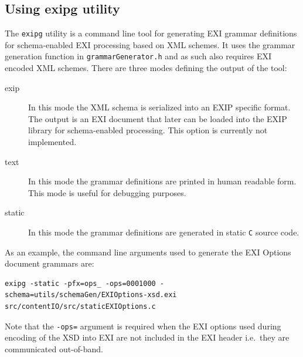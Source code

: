 \subsection{Using exipg utility}
The \texttt{exipg} utility is a command line tool for generating EXI grammar definitions
for schema-enabled EXI processing based on XML schemes.
It uses the grammar generation
function in \texttt{grammarGenerator.h} and as such also requires EXI encoded XML schemes.
There are three modes defining the output of the tool:
\begin{description}
 \item[exip] In this mode the XML schema is serialized into an EXIP specific format. The output is
	    an EXI document that later can be loaded into the EXIP library for schema-enabled processing.
	    This option is currently not implemented.
 \item[text] In this mode the grammar definitions are printed in human readable form. This mode is
	    useful for debugging purposes.
 \item[static] In this mode the grammar definitions are generated in static \texttt{C} source code.
 \end{description}
As an example, the command line arguments used to generate the EXI Options document grammars are:
\begin{lstlisting}
exipg -static -pfx=ops_ -ops=0001000 -schema=utils/schemaGen/EXIOptions-xsd.exi src/contentIO/src/staticEXIOptions.c
\end{lstlisting}
Note that the \texttt{-ops=} argument is required when the EXI options used during encoding of
the XSD into EXI are not included in the EXI header i.e.\ they are communicated
out-of-band.

